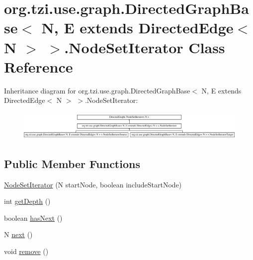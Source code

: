 \hypertarget{classorg_1_1tzi_1_1use_1_1graph_1_1_directed_graph_base_3_01_n_00_01_e_01extends_01_directed_edgbaf8745f85cce6e8c1e3fafdeb83c711}{\section{org.\-tzi.\-use.\-graph.\-Directed\-Graph\-Base$<$ N, E extends Directed\-Edge$<$ N $>$ $>$.Node\-Set\-Iterator Class Reference}
\label{classorg_1_1tzi_1_1use_1_1graph_1_1_directed_graph_base_3_01_n_00_01_e_01extends_01_directed_edgbaf8745f85cce6e8c1e3fafdeb83c711}
}
Inheritance diagram for org.\-tzi.\-use.\-graph.\-Directed\-Graph\-Base$<$ N, E extends Directed\-Edge$<$ N $>$ $>$.Node\-Set\-Iterator\-:\begin{figure}[H]
\begin{center}
\leavevmode
\includegraphics[height=1.455806cm]{classorg_1_1tzi_1_1use_1_1graph_1_1_directed_graph_base_3_01_n_00_01_e_01extends_01_directed_edgbaf8745f85cce6e8c1e3fafdeb83c711}
\end{center}
\end{figure}
\subsection*{Public Member Functions}
\begin{DoxyCompactItemize}
\item 
\hyperlink{classorg_1_1tzi_1_1use_1_1graph_1_1_directed_graph_base_3_01_n_00_01_e_01extends_01_directed_edgbaf8745f85cce6e8c1e3fafdeb83c711_aefb0b69fd09e81803672dc11b2d50868}{Node\-Set\-Iterator} (N start\-Node, boolean include\-Start\-Node)
\item 
int \hyperlink{classorg_1_1tzi_1_1use_1_1graph_1_1_directed_graph_base_3_01_n_00_01_e_01extends_01_directed_edgbaf8745f85cce6e8c1e3fafdeb83c711_a5b6a8c31a4b626e8281f3dd0d58596e9}{get\-Depth} ()
\item 
boolean \hyperlink{classorg_1_1tzi_1_1use_1_1graph_1_1_directed_graph_base_3_01_n_00_01_e_01extends_01_directed_edgbaf8745f85cce6e8c1e3fafdeb83c711_aab50b7e6ba3b87fa52f78f63f0c708d5}{has\-Next} ()
\item 
N \hyperlink{classorg_1_1tzi_1_1use_1_1graph_1_1_directed_graph_base_3_01_n_00_01_e_01extends_01_directed_edgbaf8745f85cce6e8c1e3fafdeb83c711_ab104ecc19796480f8f5330cb7477a90a}{next} ()
\item 
void \hyperlink{classorg_1_1tzi_1_1use_1_1graph_1_1_directed_graph_base_3_01_n_00_01_e_01extends_01_directed_edgbaf8745f85cce6e8c1e3fafdeb83c711_a8a7e5212f14b91abc96a3afb83e065a3}{remove} ()
\end{DoxyCompactItemize}
